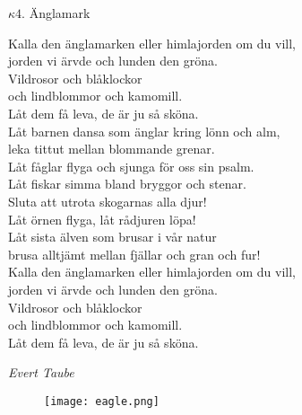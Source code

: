 \documentclass[a6paper,10pt]{article}
\begin{document}
\setlength{\oddsidemargin}{-0.47in}
\noindent
\begin{center}
\Large $\kappa4$. Änglamark \\ 
\end{center}
Kalla den änglamarken eller himlajorden om du vill,\\
jorden vi ärvde och lunden den gröna.\\
Vildrosor och blåklockor \\
och lindblommor och kamomill.\\
Låt dem få leva, de är ju så sköna.
\vspace{5pt}\\
Låt barnen dansa som änglar kring lönn och alm,\\
leka tittut mellan blommande grenar.\\
Låt fåglar flyga och sjunga för oss sin psalm.\\
Låt fiskar simma bland bryggor och stenar.
\vspace{5pt}\\
Sluta att utrota skogarnas alla djur!\\
Låt örnen flyga, låt rådjuren löpa!\\
Låt sista älven som brusar i vår natur\\
brusa alltjämt mellan fjällar och gran och fur!
\vspace{5pt}\\
Kalla den änglamarken eller himlajorden om du vill,\\
jorden vi ärvde och lunden den gröna.\\
Vildrosor och blåklockor \\
och lindblommor och kamomill.\\
Låt dem få leva, de är ju så sköna.
\begin{flushright}
\textit{Evert Taube}
\end{flushright}
\begin{figure}[!h]
\centering
\texttt{[image: eagle.png]}
\end{figure}
\end{document}
